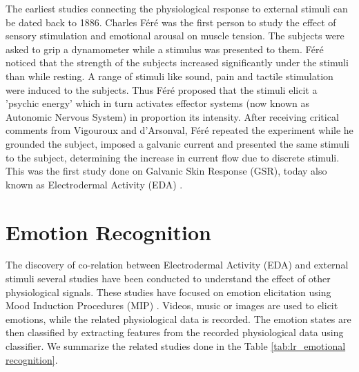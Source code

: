 
The earliest studies connecting the physiological response to external stimuli can be dated back to 1886. Charles F\'er\'e was the first person to study the effect of sensory stimulation and emotional arousal on muscle tension. The subjects were asked to grip a dynamometer while a stimulus was presented to them. F\'er\'e noticed that the strength of the subjects increased significantly under the stimuli than while resting. A range of stimuli like sound, pain and tactile stimulation were induced to the subjects. Thus F\'er\'e proposed that the stimuli elicit a 'psychic energy' which in turn activates effector systems (now known as Autonomic Nervous System) in proportion its intensity. After receiving critical comments from Vigouroux and d'Arsonval, F\'er\'e repeated the experiment while he grounded the subject, imposed a galvanic current and presented the same stimuli to the subject, determining the increase in current flow due to discrete stimuli. This was the first study done on Galvanic Skin Response (GSR), today also known as Electrodermal Activity (EDA) \cite{neumann_early_1970}.

\section{Emotion Recognition} \label{sec:emo_rec} The discovery of co-relation between Electrodermal Activity (EDA) and external stimuli several studies have been conducted to understand the effect of other physiological signals. These studies have focused on emotion elicitation using Mood Induction Procedures (MIP) \cite{gross_emotion_1995}. Videos, music or images are used to elicit emotions, while the related physiological data is recorded. The emotion states are then classified by extracting features from the recorded physiological data using classifier. We summarize the related studies done in the Table \ref{tab:lr_emotional recognition}.

